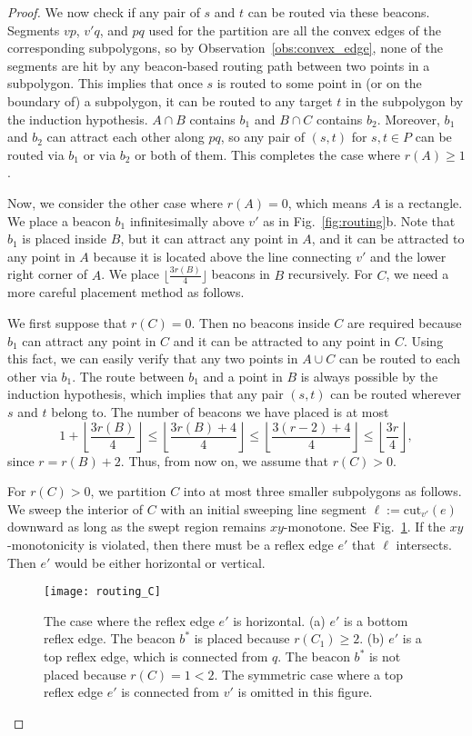 \documentclass[11pt]{article}
\newcommand{\cut}{\ensuremath{\mathrm{cut}}}
\theoremstyle{definition}
\let\geq\geqslant
\let\leq\leqslant
\begin{document}
\begin{proof}
We now check if any pair of $s$ and $t$ can be routed via these beacons. 
Segments $vp$, $v'q$, and $pq$ used for the partition are all the convex edges of the corresponding subpolygons, so by Observation~\ref{obs:convex_edge}, none of the segments are hit by any beacon-based routing path between two points in a subpolygon. This implies that once $s$ is routed to some point in (or on the boundary of) a subpolygon, it can be routed to any target $t$ in the subpolygon by the induction hypothesis. $A\cap B$ contains $b_1$ and $B\cap C$ contains $b_2$. Moreover, $b_1$ and $b_2$ can attract each other along $pq$, so any pair of $(s, t)$ for $s, t \in P$ can be routed via $b_1$ or via $b_2$ or both of them. This completes the case where $r(A)\geq 1$.

Now, we consider the other case where $r(A)=0$, which means $A$ is a rectangle. We place a beacon $b_1$ infinitesimally above $v'$ as in Fig.~\ref{fig:routing}b. Note that $b_1$ is placed inside $B$, but it can attract any point in $A$, and it can be attracted to any point in $A$ because it is located above the line connecting $v'$ and the lower right corner of $A$. We place $\lfloor \frac{3r(B)}{4}\rfloor$ beacons in $B$ recursively. For $C$, we need a more careful placement method as follows. 

We first suppose that $r(C) = 0$. Then no beacons inside $C$ are required because $b_1$ can attract any point in $C$ and it can be attracted to any point in $C$. Using this fact, we can easily verify that any two points in $A\cup C$ can be routed to each other via $b_1$. The route between $b_1$ and a point in $B$ is always possible by the induction hypothesis, which implies that any pair $(s, t)$ can be routed wherever $s$ and $t$ belong to. The number of beacons we have placed is at most
$$1+\left\lfloor \frac{3r(B)}{4}\right\rfloor \leq \left\lfloor \frac{3r(B)+4}{4}\right\rfloor \leq \left\lfloor\frac{3(r-2)+4}{4}\right\rfloor \leq \left\lfloor \frac{3r}{4}\right\rfloor,$$
since $r = r(B)+2$. Thus, from now on, we assume that $r(C) > 0$. 

For $r(C) > 0$, we partition $C$ into at most three smaller subpolygons as follows. We sweep the interior of $C$ with an initial sweeping line segment $\ell:= \cut_{v'}(e)$ downward as long as the swept region remains $xy$-monotone. See Fig.~\ref{fig:routing_C}. If the $xy$-monotonicity is violated, then there must be a reflex edge $e'$ that $\ell$ intersects. Then $e'$ would be either horizontal or vertical. 

\begin{figure}[tb]
\centering
\texttt{[image: routing\_C]}
\caption{The case where the reflex edge $e'$ is horizontal. (a) $e'$ is a bottom reflex edge. The beacon $b^*$ is placed because $r(C_1)\geq 2$. (b) $e'$ is a top reflex edge, which is connected from $q$. The beacon $b^*$ is not placed because $r(C) = 1 < 2$. The symmetric case where a top reflex edge $e'$ is connected from $v'$ is omitted in this figure.}
\label{fig:routing_C}
\end{figure}


\end{proof}
\end{document}
